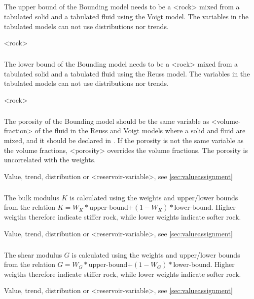 {\subparagraph{}
 \slist
   \item \Description The upper bound of the Bounding model needs to be a <rock> mixed from a tabulated solid and a tabulated fluid using the Voigt model. The variables in the tabulated models can not use distributions nor trends.
   \item \Argument <rock>
   \item \Default
 \elist

\subparagraph{}
 \slist
   \item \Description The lower bound of the Bounding model needs to be a <rock> mixed from a tabulated solid and a tabulated fluid using the Reuss model. The variables in the tabulated models can not use distributions nor trends.
   \item \Argument <rock>
   \item \Default
 \elist

\subparagraph{}
 \slist
   \item \Description The porosity of the Bounding model should be the same variable as <volume-fraction> of the fluid in the Reuss and Voigt models where a solid and fluid are mixed, and it should be declared in . If the porosity is not the same variable as the volume fractions, <porosity> overrides the volume fractions. The porosity is uncorrelated with the weights.
   \item \Argument Value, trend, distribution or <reservoir-variable>, see \autoref{sec:valueassignment}
   \item \Default
 \elist

\subparagraph{}
 \slist
   \item \Description The bulk modulus $K$ is calculated using the weights and upper/lower bounds from the relation $K=W_K*$upper-bound$+(1-W_K)*$lower-bound. Higher weigths therefore indicate stiffer rock, while lower weights indicate softer rock.
   \item \Argument Value, trend, distribution or <reservoir-variable>, see \autoref{sec:valueassignment}
   \item \Default
 \elist

\subparagraph{}
 \slist
   \item \Description The shear modulus $G$ is calculated using the weights and upper/lower bounds from the relation $G=W_G*$upper-bound$+(1-W_G)*$lower-bound. Higher weigths therefore indicate stiffer rock, while lower weights indicate softer rock.
   \item \Argument Value, trend, distribution or <reservoir-variable>, see \autoref{sec:valueassignment}
   \item \Default
 \elist

}
